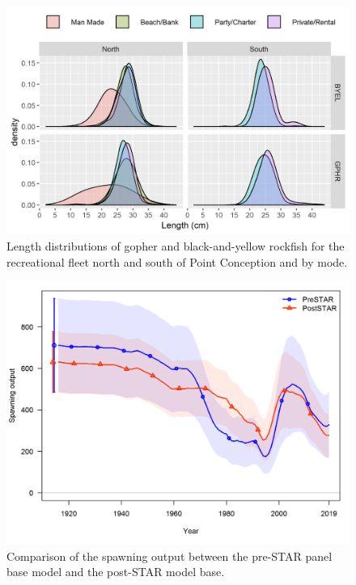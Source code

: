 \documentclass[12pt,]{article}
\begin{document}
\FloatBarrier

\begin{figure}
\centering
\includegraphics{Figures/Rec_lengths_justification.png}
\caption{Length distributions of gopher and black-and-yellow rockfish
for the recreational fleet north and south of Point Conception and by
mode. \label{fig:Rec_lengths_justification}}
\end{figure}

\begin{figure}
\centering
\includegraphics{Figures/preSTAR_postSTAR_compare_spawnbio}
\caption{Comparison of the spawning output between the pre-STAR panel
base model and the post-STAR model base.
\label{fig:preSTAR_postSTAR_compare_spawnbio}}
\end{figure}
\end{document}
